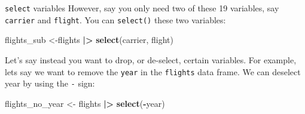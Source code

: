 \documentclass[
  ignorenonframetext,
]{beamer}
\newenvironment{Shaded}{\begin{snugshade}}{\end{snugshade}}
\newcommand{\FunctionTok}[1]{\textcolor[rgb]{0.13,0.29,0.53}{\textbf{#1}}}
\newcommand{\NormalTok}[1]{#1}
\newcommand{\OtherTok}[1]{\textcolor[rgb]{0.56,0.35,0.01}{#1}}
\newcommand{\SpecialCharTok}[1]{\textcolor[rgb]{0.81,0.36,0.00}{\textbf{#1}}}
\begin{document}
\begin{frame}[fragile]{\texttt{select} variables}
\protect\hypertarget{select-variables-1}{}
However, say you only need two of these 19 variables, say
\texttt{carrier} and \texttt{flight}. You can \texttt{select()} these
two variables:

\normalsize

\begin{Shaded}
\begin{Highlighting}[]
\NormalTok{flights\_sub }\OtherTok{\textless{}{-}}\NormalTok{flights }\SpecialCharTok{|\textgreater{}} 
  \FunctionTok{select}\NormalTok{(carrier, flight)}
\end{Highlighting}
\end{Shaded}

\normalsize

Let's say instead you want to drop, or de-select, certain variables. For
example, lets say we want to remove the \texttt{year} in the
\texttt{flights} data frame. We can deselect year by using the
\texttt{-} sign:

\normalsize

\begin{Shaded}
\begin{Highlighting}[]
\NormalTok{flights\_no\_year }\OtherTok{\textless{}{-}}\NormalTok{ flights }\SpecialCharTok{|\textgreater{}} \FunctionTok{select}\NormalTok{(}\SpecialCharTok{{-}}\NormalTok{year)}
\end{Highlighting}
\end{Shaded}

\normalsize
\end{frame}
\end{document}
